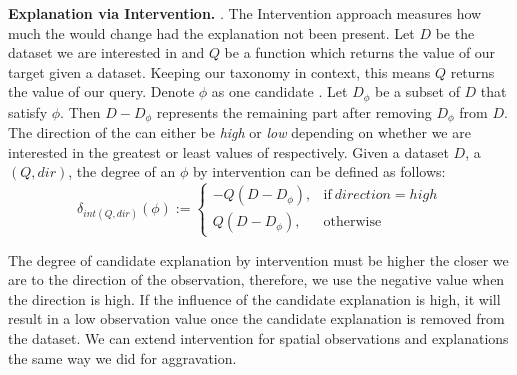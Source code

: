

{\bf {Explanation via Intervention.}} 
. 
The Intervention approach measures how much the {\fact} would change had the explanation not been present. Let $D$ be the dataset we are interested in and $Q$ be a function which returns the value of our target {\fact} given a dataset. Keeping our taxonomy in context, this means $Q$ returns the value of our  {\fact} query. Denote $\phi$ as one candidate {\explanation}. 
Let $D_{\phi}$ be a subset of $D$ that satisfy $\phi$. 
Then $D - D_{\phi}$ represents the remaining part after removing $D_{\phi}$ from $D$. The direction of the {\fact} can either be \textit{high} or \textit{low} depending on whether we are interested in the greatest or least values of {\fact} respectively. Given a dataset $D$, a {\fact}$(Q, dir)$, the degree of an {\explanation} $\phi$ by intervention can be defined as follows:
\begin{equation}
\delta_{int(Q, dir)}(\phi):=
\begin{cases}
-Q(D-D_{\phi}), & \text{if}\ direction=high \\
Q(D-D_{\phi}), & \text{otherwise}
\end{cases}
\end{equation}

The degree of candidate explanation by intervention must be higher the closer we are to the direction of the observation, therefore, we use the negative value when the direction is high. If the influence of the candidate explanation is high, it will result in a low observation value once the candidate explanation is removed from the dataset.
 We can extend intervention for spatial observations and explanations the same way we did for aggravation. 


